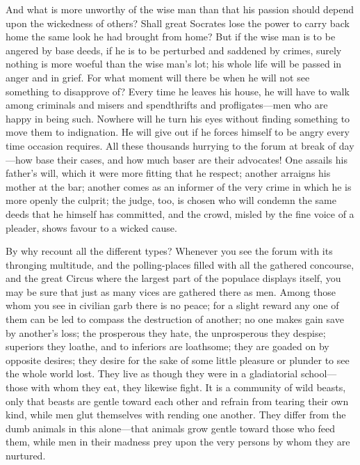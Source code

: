 And what is more unworthy of the wise man than that his passion should
depend upon the wickedness of others? Shall great Socrates lose the
power to carry back home the same look he had brought from home? But
if the wise man is to be angered by base deeds, if he is to be
perturbed and saddened by crimes, surely nothing is more woeful than
the wise man's lot; his whole life will be passed in anger and in
grief. For what moment will there be when he will not see something to
disapprove of? Every time he leaves his house, he will have to walk
among criminals and misers and spendthrifts and 
prof\-li\-gates---men who are happy in being such. Nowhere will he
turn his eyes without finding something to move them to indignation.
He will give out if he forces himself to be angry every time occasion
requires. All these thousands hurrying to the forum at break of
day---how base their cases, and how much baser are their advocates!
One assails his father's will, which it were more fitting that he
respect; another arraigns his mother at the bar; another comes as an
informer of the very crime in which he is more openly the culprit; the
judge, too, is chosen who will condemn the same deeds that he himself
has committed, and the crowd, misled by the fine voice of a pleader,
shows favour to a wicked cause.

By why recount all the different types? Whenever you see the forum
with its thronging multitude, and the polling-places filled with all
the gathered concourse, and the great Circus where the largest part of
the populace displays itself, you may be sure that just as many vices
are gathered there as men. Among those whom you see in civilian garb
there is no peace; for a slight reward any one of them can be led to
compass the destruction of another; no one makes gain save by
another's loss; the prosperous they hate, the unprosperous they
despise; superiors they loathe, and to inferiors are loathsome; they
are goaded on by opposite desires; they desire for the sake of some
little pleasure or plunder to see the whole world lost. They live as
though they were in a gladiatorial school---those with whom they eat,
they likewise fight. It is a community of wild beasts, only that
beasts are gentle toward each other and refrain from tearing their own
kind, while men  glut themselves with rending one another.
They differ from the dumb animals in this a\-lone---that animals grow
gentle toward those who feed them, while men in their madness prey
upon the very persons by whom they are nurtured.

